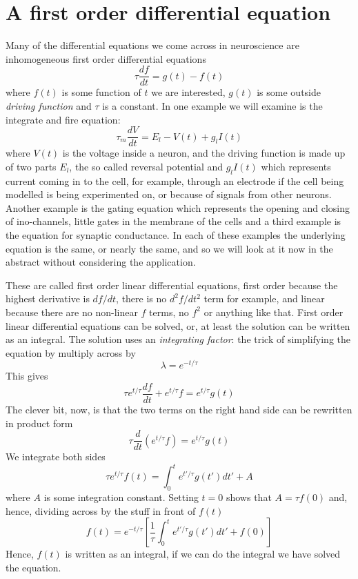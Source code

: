 \documentclass{article}
\begin{document}
\section*{A first order differential equation}
Many of the differential equations we come across in neuroscience are
inhomogeneous first order differential equations
\begin{equation}
\tau\frac{df}{dt}=g(t)-f(t)
\end{equation}
where $f(t)$ is some function of $t$ we are interested, $g(t)$ is some
outside \textsl{driving function} and $\tau$ is a constant. In one
example we will examine is the integrate and fire equation:
\begin{equation}
\tau_m\frac{dV}{dt}=E_l-V(t)+g_lI(t)
\end{equation}
where $V(t)$ is the voltage inside a neuron, and the driving function
is made up of two parts $E_l$, the so called reversal potential and
$g_lI(t)$ which represents current coming in to the cell, for example,
through an electrode if the cell being modelled is being experimented
on, or because of signals from other neurons. Another example is the
gating equation which represents the opening and closing of
ino-channels, little gates in the membrane of the cells and a third
example is the equation for synaptic conductance. In each of these
examples the underlying equation is the same, or nearly the same, and
so we will look at it now in the abstract without considering the
application.


These are called first order linear differential equations, first
order because the highest derivative is $df/dt$, there is no
$d^2f/dt^2$ term for example, and linear because there are no
non-linear $f$ terms, no $f^2$ or anything like that. First order
linear differential equations can be solved, or, at least the solution
can be written as an integral. The solution uses an
\textsl{integrating factor}: the trick of simplifying the equation by
multiply across by
\begin{equation}
\lambda=e^{-t/\tau}
\end{equation}
This gives
\begin{equation}
\tau e^{t/\tau}\frac{df}{dt}+e^{t/\tau}f=e^{t/\tau}g(t)
\end{equation}
The clever bit, now, is that the two terms on the right hand side can
be rewritten in product form
\begin{equation}
\tau \frac{d}{dt}\left(e^{t/\tau}f\right)=e^{t/\tau}g(t)
\end{equation}
We integrate both sides
\begin{equation}
\tau e^{t/\tau}f(t)=\int_0^t e^{t'/\tau} g(t')dt'+A
\end{equation}
where $A$ is some integration constant. Setting $t=0$ shows that $A=\tau f(0)$ and, hence, dividing across by the stuff in front of $f(t)$
\begin{equation}
f(t)=e^{-t/\tau}\left[\frac{1}{\tau}\int_0^t e^{t'/\tau} g(t')dt'+f(0)\right]
\end{equation}
Hence, $f(t)$ is written as an integral, if we can do the integral we
have solved the equation.
\end{document}
